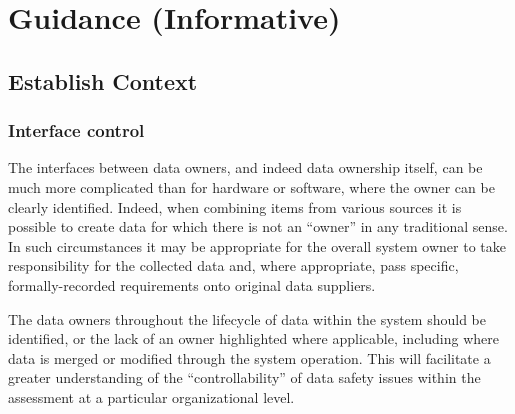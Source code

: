 %
%
\section{Guidance (Informative)} \label{bkm:guidance}



\subsection{Establish Context}
\subsubsection{Interface control}
The interfaces between \glspl{data owner}, and indeed data ownership itself, can be much more complicated than for hardware or software, where the owner can be clearly identified. Indeed, when combining items from various sources it is possible to create data for which there is not an ``owner'' in any traditional sense. In such circumstances it may be appropriate for the overall system owner to take responsibility for the collected data and, where appropriate, pass specific, formally-recorded requirements onto original data suppliers. 

The \glspl{data owner} throughout the lifecycle of data within the system should be identified, or the lack of an owner highlighted where applicable, including where data is merged or modified through the system operation. This will facilitate a greater understanding of the ``controllability'' of data safety issues within the assessment at a particular organizational level.

